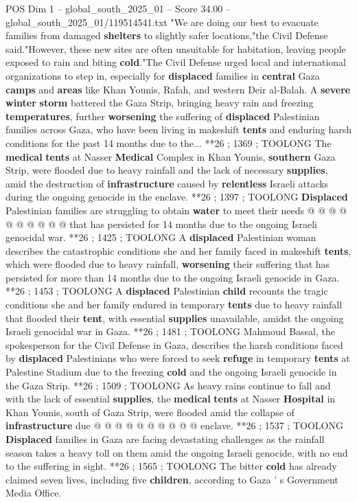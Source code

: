 \begin{textsample}{POS Dim 1 – global\_south\_2025\_01 – Score 34.00 – global\_south\_2025\_01/119514541.txt}  \label{ex:f1_pos_292}
"We are doing our best to evacuate families from damaged \textbf{shelters} to slightly safer locations,"the Civil Defense said."However, these new sites are often unsuitable for habitation, leaving people exposed to rain and biting \textbf{cold}."The Civil Defense urged local and international organizations to step in, especially for \textbf{displaced} families in \textbf{central} Gaza \textbf{camps} and \textbf{areas} like Khan Younis, Rafah, and western Deir al-Balah.
A \textbf{severe} \textbf{winter} \textbf{storm} battered the Gaza Strip, bringing heavy rain and freezing \textbf{temperatures}, further \textbf{worsening} the suffering of \textbf{displaced} Palestinian families across Gaza, who have been living in makeshift \textbf{tents} and enduring harsh conditions for the past 14 months due to the... **26 ; 1369 ; TOOLONG The \textbf{medical} \textbf{tents} at Nasser \textbf{Medical} Complex in Khan Younis, \textbf{southern} Gaza Strip, were flooded due to heavy rainfall and the lack of necessary \textbf{supplies}, amid the destruction of \textbf{infrastructure} caused by \textbf{relentless} Israeli attacks during the ongoing genocide in the enclave. **26 ; 1397 ; TOOLONG \textbf{Displaced} Palestinian families are struggling to obtain \textbf{water} to meet their needs @ @ @ @ @ @ @ @ @ @ that has persisted for 14 months due to the ongoing Israeli genocidal war. **26 ; 1425 ; TOOLONG A \textbf{displaced} Palestinian woman describes the catastrophic conditions she and her family faced in makeshift \textbf{tents}, which were flooded due to heavy rainfall, \textbf{worsening} their suffering that has persisted for more than 14 months due to the ongoing Israeli genocide in Gaza. **26 ; 1453 ; TOOLONG A \textbf{displaced} Palestinian \textbf{child} recounts the tragic conditions she and her family endured in temporary \textbf{tents} due to heavy rainfall that flooded their \textbf{tent}, with essential \textbf{supplies} unavailable, amidst the ongoing Israeli genocidal war in Gaza. **26 ; 1481 ; TOOLONG Mahmoud Bassal, the spokesperson for the Civil Defense in Gaza, describes the harsh conditions faced by \textbf{displaced} Palestinians who were forced to seek \textbf{refuge} in temporary \textbf{tents} at Palestine Stadium due to the freezing \textbf{cold} and the ongoing Israeli genocide in the Gaza Strip. **26 ; 1509 ; TOOLONG As heavy rains continue to fall and with the lack of essential \textbf{supplies}, the \textbf{medical} \textbf{tents} at Nasser \textbf{Hospital} in Khan Younis, south of Gaza Strip, were flooded amid the collapse of \textbf{infrastructure} due @ @ @ @ @ @ @ @ @ @ enclave. **26 ; 1537 ; TOOLONG \textbf{Displaced} families in Gaza are facing devastating challenges as the rainfall season takes a heavy toll on them amid the ongoing Israeli genocide, with no end to the suffering in sight. **26 ; 1565 ; TOOLONG The bitter \textbf{cold} has already claimed seven lives, including five \textbf{children}, according to Gaza ' s Government Media Office.

\end{textsample}
